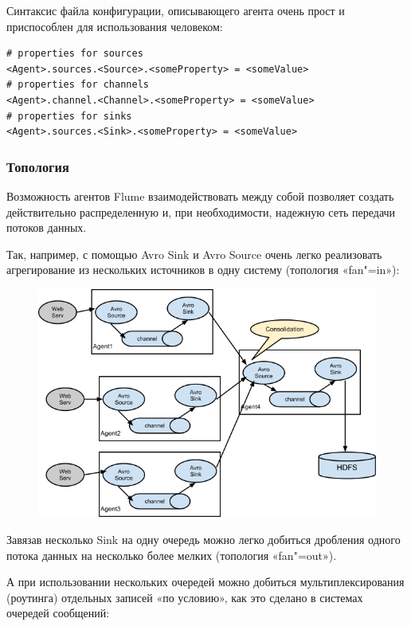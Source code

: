 \documentclass[10pt, a5paper]{article}
\begin{document}
Синтаксис файла конфигурации, описывающего агента очень прост и приспособлен для использования человеком:

\begin{verbatim}
# properties for sources 
<Agent>.sources.<Source>.<someProperty> = <someValue>
# properties for channels 
<Agent>.channel.<Channel>.<someProperty> = <someValue>
# properties for sinks 
<Agent>.sources.<Sink>.<someProperty> = <someValue> 
\end{verbatim}
\subsubsection*{Топология}

Возможность агентов Flume взаимодействовать между собой \linebreak позволяет создать действительно распределенную и, при необходимости, надежную сеть передачи потоков данных.

Так, например, с помощью Avro Sink и Avro Source очень легко реализовать агрегирование из нескольких источников в одну систему (топология «fan"=in»):


\begin{figure}[h!]
  \centering
  \includegraphics[scale=0.5]{21_2014_UserGuide_image02.png}
\end{figure}

Завязав несколько Sink на одну очередь можно легко добиться дробления одного потока данных на несколько более мелких (топология «fan"=out»).

А при использовании нескольких очередей можно добиться мультиплексирования (роутинга) отдельных записей «по условию», как это сделано в системах очередей сообщений:
\end{document}
